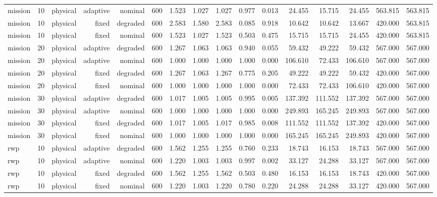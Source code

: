 \begin{tabular}{lrrrrrrrrrrrrrrr}
mission & 10 & physical & adaptive & nominal & 600 & 1.523 & 1.027 & 1.027 & 0.977 & 0.013 & 24.455 & 15.715 & 24.455 & 563.815 & 563.815 \\
mission & 10 & physical & fixed & degraded & 600 & 2.583 & 1.580 & 2.583 & 0.085 & 0.918 & 10.642 & 10.642 & 13.667 & 420.000 & 563.815 \\
mission & 10 & physical & fixed & nominal & 600 & 1.523 & 1.027 & 1.523 & 0.503 & 0.475 & 15.715 & 15.715 & 24.455 & 420.000 & 563.815 \\
mission & 20 & physical & adaptive & degraded & 600 & 1.267 & 1.063 & 1.063 & 0.940 & 0.055 & 59.432 & 49.222 & 59.432 & 567.000 & 567.000 \\
mission & 20 & physical & adaptive & nominal & 600 & 1.000 & 1.000 & 1.000 & 1.000 & 0.000 & 106.610 & 72.433 & 106.610 & 567.000 & 567.000 \\
mission & 20 & physical & fixed & degraded & 600 & 1.267 & 1.063 & 1.267 & 0.775 & 0.205 & 49.222 & 49.222 & 59.432 & 420.000 & 567.000 \\
mission & 20 & physical & fixed & nominal & 600 & 1.000 & 1.000 & 1.000 & 1.000 & 0.000 & 72.433 & 72.433 & 106.610 & 420.000 & 567.000 \\
mission & 30 & physical & adaptive & degraded & 600 & 1.017 & 1.005 & 1.005 & 0.995 & 0.005 & 137.392 & 111.552 & 137.392 & 567.000 & 567.000 \\
mission & 30 & physical & adaptive & nominal & 600 & 1.000 & 1.000 & 1.000 & 1.000 & 0.000 & 249.893 & 165.245 & 249.893 & 567.000 & 567.000 \\
mission & 30 & physical & fixed & degraded & 600 & 1.017 & 1.005 & 1.017 & 0.985 & 0.008 & 111.552 & 111.552 & 137.392 & 420.000 & 567.000 \\
mission & 30 & physical & fixed & nominal & 600 & 1.000 & 1.000 & 1.000 & 1.000 & 0.000 & 165.245 & 165.245 & 249.893 & 420.000 & 567.000 \\
rwp & 10 & physical & adaptive & degraded & 600 & 1.562 & 1.255 & 1.255 & 0.760 & 0.233 & 18.743 & 16.153 & 18.743 & 567.000 & 567.000 \\
rwp & 10 & physical & adaptive & nominal & 600 & 1.220 & 1.003 & 1.003 & 0.997 & 0.002 & 33.127 & 24.288 & 33.127 & 567.000 & 567.000 \\
rwp & 10 & physical & fixed & degraded & 600 & 1.562 & 1.255 & 1.562 & 0.503 & 0.480 & 16.153 & 16.153 & 18.743 & 420.000 & 567.000 \\
rwp & 10 & physical & fixed & nominal & 600 & 1.220 & 1.003 & 1.220 & 0.780 & 0.220 & 24.288 & 24.288 & 33.127 & 420.000 & 567.000 \\

\end{tabular}

